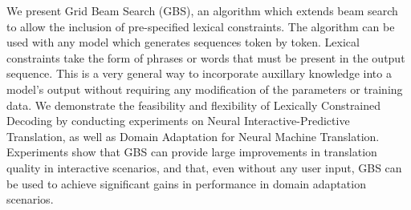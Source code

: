 We present Grid Beam Search (GBS), an algorithm which extends beam search to allow the inclusion of pre-specified lexical constraints. The algorithm can be used with any model which generates sequences token by token. Lexical constraints take the form of phrases or words that must be present in the output sequence. This is a very general way to incorporate auxillary knowledge into a model's output without requiring any modification of the parameters or training data. We demonstrate the feasibility and flexibility of Lexically Constrained Decoding by conducting experiments on Neural Interactive-Predictive Translation, as well as Domain Adaptation for Neural Machine Translation. Experiments show that GBS can provide large improvements in translation quality in interactive scenarios, and that, even without any user input, GBS can be used to achieve significant gains in performance in domain adaptation scenarios.
